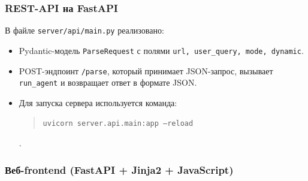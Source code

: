 \subsubsection{REST-API на FastAPI}

В файле \texttt{server/api/main.py} реализовано:
\begin{itemize}
    \item Pydantic-модель \texttt{ParseRequest} с полями \texttt{url, user\_query, mode, dynamic}.
    \item POST-эндпоинт \texttt{/parse}, который принимает JSON-запрос, вызывает \texttt{run\_agent} и возвращает ответ в формате JSON.
    \item Для запуска сервера используется команда:
    \begin{quote}
      \texttt{uvicorn server.api.main:app --reload}
    \end{quote}
    \cite{FastAPIDocumentation}.
\end{itemize}

\subsubsection{Веб-frontend (FastAPI + Jinja2 + JavaScript)}

